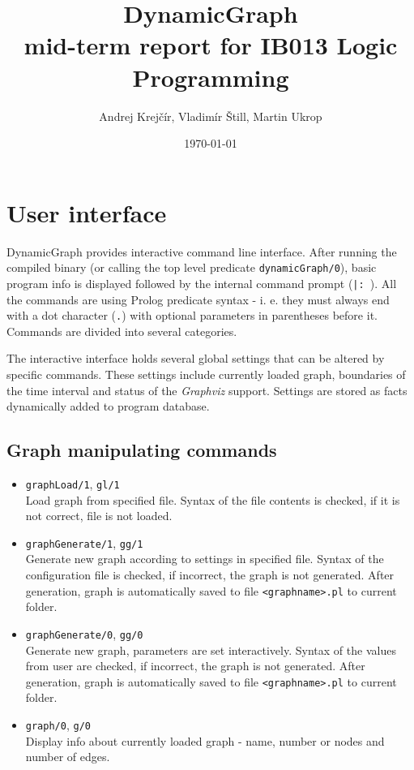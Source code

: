\documentclass[11pt, a4paper,draft]{article}
\newcommand{\pl}[1]{\texttt{#1}} %
\theoremstyle{plain}
\theoremstyle{definition}
\theoremstyle{remark}
\newcommand{\gv}{\textit{Graphviz}}
\begin{document}
\title{{\Huge DynamicGraph} \\ {\large mid-term report for IB013 Logic Programming} }
\author{Andrej Krejčír, Vladimír Štill, Martin Ukrop}
\date{\today}
\maketitle

\section{User interface}

DynamicGraph provides interactive command line interface. After running the compiled binary (or calling the
top level predicate \pl{dynamicGraph/0}), basic program info is displayed followed by the internal command prompt (\pl{|: }).
 All the commands are using Prolog predicate syntax - i. e. they must always end with a dot character (\pl{.}) 
 with optional parameters in parentheses before it. Commands are divided into several categories.

The interactive interface holds several global settings that can be altered by specific commands. 
These settings include currently loaded graph, boundaries of the time interval and status of the \gv{} support. 
Settings are stored as facts dynamically added to program database.

\subsection{Graph manipulating commands}
\begin{itemize}
\item \pl{graphLoad/1}, \pl{gl/1} \\
Load graph from specified file. Syntax of the file contents is checked, if it is not correct, file is not loaded.

\item \pl{graphGenerate/1}, \pl{gg/1} \\
Generate new graph according to settings in specified file. 
Syntax of the configuration file is checked, if incorrect, the graph is not generated. 
After generation, graph is automatically saved to file \pl{<graphname>.pl} to current folder.

\item \pl{graphGenerate/0}, \pl{gg/0} \\
Generate new graph, parameters are set interactively. 
Syntax  of the values from user are checked, if incorrect, the graph is not generated. 
After generation, graph is automatically saved to file \pl{<graphname>.pl} to current folder.

\item \pl{graph/0}, \pl{g/0} \\
Display info about currently loaded graph - name, number or nodes and number of edges.
\end{itemize}
\end{document}
